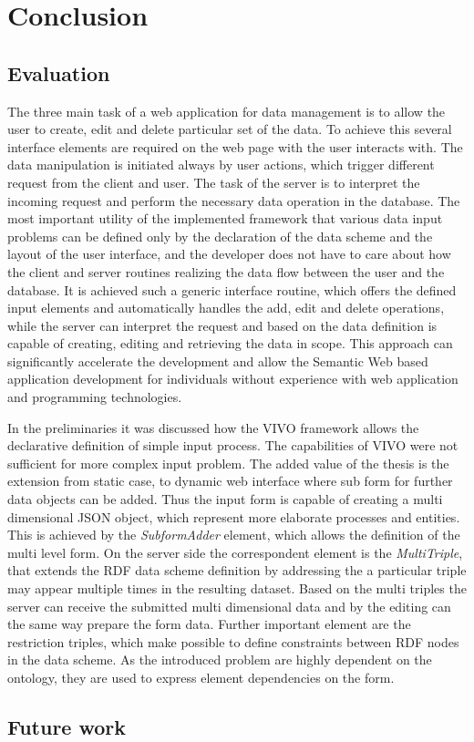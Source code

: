 

\chapter{Conclusion}

\section{Evaluation}

The three main task of a web application for data management is to allow the user to create, edit and delete particular set of the data. To achieve this several interface elements are required on the web page with the user interacts with. The data manipulation is initiated always by user actions, which trigger different request from the client and user. The task of the server is to interpret the incoming request and perform the necessary data operation in the database. The most important utility of the implemented framework that various data input problems can be defined only by the declaration of the data scheme and the layout of the user interface, and the developer does not have to care about how the client and server routines realizing the data flow between the user and the database. It is achieved such a generic interface routine, which offers the defined input elements and automatically handles the add, edit and delete operations, while the server can interpret the request and based on the data definition is capable of creating, editing and retrieving the data in scope. This approach can significantly accelerate the development and allow the Semantic Web based application development for individuals without experience with web application and programming technologies.

In the preliminaries it was discussed how the VIVO framework allows the declarative definition of simple input process. The capabilities of VIVO were not sufficient for more complex input problem. The added value of the thesis is the extension from static case, to dynamic web interface where sub form for further data objects can be added. Thus the input form is capable of creating a multi dimensional JSON object, which represent more elaborate processes and entities. This is achieved by the \textit{SubformAdder} element, which allows the definition of the multi level form. On the server side the correspondent element is the \textit{MultiTriple}, that extends the RDF data scheme definition by addressing the a particular triple may appear multiple times in the resulting dataset. Based on the multi triples the server can receive the submitted multi dimensional data and by the editing can the same way prepare the form data. Further important element are the restriction triples, which make possible to define constraints between RDF nodes in the data scheme. As the introduced problem are highly dependent on the ontology, they are used to express element dependencies on the form.




\section{Future work}


